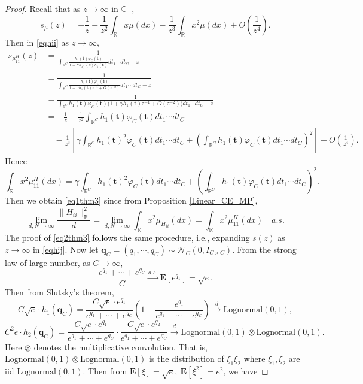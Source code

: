 \documentclass{article}
\newcommand{\E}{\mathbf{E}}
\newcommand{\mb}{\mathbb}
\newcommand\mf{\mathbf}
\newcommand\ml{\mathcal}
\newcommand{\rw}{\rightarrow}
\newcommand{\1}{^{(1)}}
\newcommand{\2}{^{(2)}}
\renewcommand{\l}{\left}
\renewcommand{\r}{\right}
\newcommand{\bea}{\begin{equation}\begin{aligned}}
\newcommand{\eea}{\end{aligned}\end{equation}}
\newcommand{\zhaoruirevise}[1]{\textcolor{black}{ #1}}
\begin{document}
\begin{proof}
   Recall that as $z\rw \infty$ in $\mb{C}^+$, 
   $$
   s_{\mu}(z)=-\frac{1}{z}-\frac{1}{z^2}\int_{\mb{R}}x\mu(dx)-\frac{1}{z^3}\int_{\mb{R}}x^2\mu(dx)+O\l(\frac{1}{z^4}\r).
   $$
   Then in \eqref{eqhii} as $z\rw\infty$,
   \bea
   s_{\mu^H_{11}}(z)&=\frac{1}{\int_{\mb{R}^C} \frac{h_1(\mf{t})\varphi_C(\mf{t})}{1+\gamma s_{\mu^H_{11}}(z)h_1(\mf{t})}dt_1\cdots dt_C-z}\\
   &=\frac{1}{\int_{\mb{R}^C} \frac{h_1(\mf{t})\varphi_C(\mf{t})}{1-\gamma h_1(\mf{t})z^{-1}+O(z^{-2})}dt_1\cdots dt_C-z}\\
   &=\frac{1}{\int_{\mb{R}^C}h_1(\mf{t})\varphi_C(\mf{t})\Big(1+\gamma h_1(\mf{t})z^{-1}+O(z^{-2})\Big)dt_1\cdots dt_C-z}\\
   &=-\frac{1}{z}-\frac{1}{z^2}\int_{\mb{R}^C}h_1(\mf{t})\varphi_C(\mf{t})dt_1\cdots dt_C\\
   &\quad -\frac{1}{z^3}\l[\gamma\int_{\mb{R}^C}h_1(\mf{t})^2\varphi_C(\mf{t})dt_1\cdots dt_C + \l(\int_{\mb{R}^C}h_1(\mf{t})\varphi_C(\mf{t})dt_1\cdots dt_C\r)^2\r]+O\l(\frac{1}{z^4}\r).
   \eea
   Hence
   $$
   \int_{\mb{R}}x^2\mu^H_{11}(dx)=\gamma\int_{\mb{R}^C}h_1(\mf{t})^2\varphi_C(\mf{t})dt_1\cdots dt_C + \l(\int_{\mb{R}^C}h_1(\mf{t})\varphi_C(\mf{t})dt_1\cdots dt_C\r)^2.
   $$
   Then we obtain \eqref{eq1thm3} since from Proposition \ref{Linear_CE_MP}, 
   $$
   \lim_{d,N\rw\infty}\frac{\|H_{ii}\|_{\operatorname{F}}^2}{d}=\lim_{d,N\rw\infty}\int_{\mb{R}}x^2\mu_{H_{ii}}(dx)=\int_{\mb{R}}x^2\mu^H_{11}(dx)\quad a.s.
   $$
   The proof of \eqref{eq2thm3} \zhaoruirevise{follows the} same procedure, i.e., expanding $s(z)$ as $z\rw\infty$ in \eqref{eqhij}.
   Now let $\mf{q}_C=(q_1,\cdots,q_C)\sim\ml N_C(0,I_{C\times C})$. From the strong law of large number, as $C\rw\infty$,
   $$
\frac{e^{q_1}+\cdots+e^{q_C}}{C}\stackrel{a.s.}{\rw}\E[e^{q_1}]=\sqrt{e}.
   $$
   Then from Slutsky's theorem,
   $$
C\sqrt{e}\cdot h_1(\mf{q}_C)=\frac{C\sqrt{e}\cdot e^{q_1}}{e^{q_1}+\cdots+e^{q_C}}\l(1-\frac{e^{q_1}}{e^{q_1}+\cdots+e^{q_C}}\r)\stackrel{d}{\rw}\operatorname{Lognormal(0,1)},
   $$
   $$
   C^2e\cdot h_2(\mf{q}_C)=\frac{C\sqrt{e}\cdot e^{q_1}}{e^{q_1}+\cdots+e^{q_C}}\cdot \frac{C\sqrt{e}\cdot e^{q_2}}{e^{q_1}+\cdots+e^{q_C}}\stackrel{d}{\rw}\operatorname{Lognormal(0,1)}\otimes\operatorname{Lognormal(0,1)}.
   $$
 Here $\otimes$ denotes the multiplicative convolution. That is, $\operatorname{Lognormal(0,1)}\otimes\operatorname{Lognormal(0,1)}$ is the distribution of $\xi_1\xi_2$ where $\xi_1,\xi_2$ are iid $\operatorname{Lognormal(0,1)}$. Then from $\E[\xi]=\sqrt{e},\ \E[\xi^2]=e^2$, we have

\end{proof}
\end{document}
